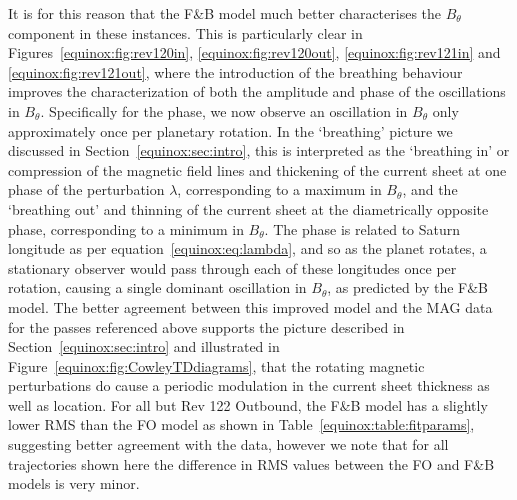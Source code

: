 It is for this reason that the F{\&}B model much better characterises the $B_{\theta}$ component in these instances. This is particularly clear in Figures~\ref{equinox:fig:rev120in}, \ref{equinox:fig:rev120out}, \ref{equinox:fig:rev121in} and \ref{equinox:fig:rev121out}, where the introduction of the breathing behaviour improves the characterization of both the amplitude and phase of the oscillations in $B_{\theta}$. Specifically for the phase, we now observe an oscillation in $B_{\theta}$ only approximately once per planetary rotation. In the `breathing' picture we discussed in Section~\ref{equinox:sec:intro}, this is interpreted as the `breathing in' or compression of the magnetic field lines and thickening of the current sheet at one phase of the perturbation $\lambda$, corresponding to a maximum in $B_{\theta}$, and the `breathing out' and thinning of the current sheet at the diametrically opposite phase, corresponding to a minimum in $B_{\theta}$. The phase is related to Saturn longitude as per equation~\ref{equinox:eq:lambda}, and so as the planet rotates, a stationary observer would pass through each of these longitudes once per rotation, causing a single dominant oscillation in $B_{\theta}$, as predicted by the F{\&}B model. The better agreement between this improved model and the MAG data for the passes referenced above supports the picture described in Section~\ref{equinox:sec:intro} and illustrated in Figure~\ref{equinox:fig:CowleyTDdiagrams}, that the rotating magnetic perturbations do cause a periodic modulation in the current sheet thickness as well as location. For all but Rev 122 Outbound, the F{\&}B model has a slightly lower RMS than the FO model as shown in Table~\ref{equinox:table:fitparams}, suggesting better agreement with the data, however we note that for all trajectories shown here the difference in RMS values between the FO and F\&B models is very minor.

